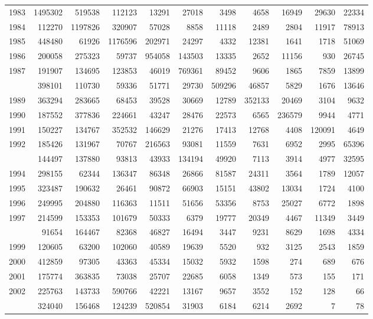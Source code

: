 \documentclass[
]{article}
\begin{document}
\begin{longtable}[t]{lrrrrrrrrrr}
1983 & 1495302 & 519538 & 112123 & 13291 & 27018 & 3498 & 4658 & 16949 & 29630 & 22334\\
1984 & 112270 & 1197826 & 320907 & 57028 & 8858 & 11118 & 2489 & 2804 & 11917 & 78913\\
1985 & 448480 & 61926 & 1176596 & 202971 & 24297 & 4332 & 12381 & 1641 & 1718 & 51069\\
1986 & 200058 & 275323 & 59737 & 954058 & 143503 & 13335 & 2652 & 11156 & 930 & 26745\\
1987 & 191907 & 134695 & 123853 & 46019 & 769361 & 89452 & 9606 & 1865 & 7859 & 13899\\
\addlinespace
1988 & 398101 & 110730 & 59336 & 51771 & 29730 & 509296 & 46857 & 5829 & 1676 & 13646\\
1989 & 363294 & 283665 & 68453 & 39528 & 30669 & 12789 & 352133 & 20469 & 3104 & 9632\\
1990 & 187552 & 377836 & 224661 & 43247 & 28476 & 22573 & 6565 & 236579 & 9944 & 4771\\
1991 & 150227 & 134767 & 352532 & 146629 & 21276 & 17413 & 12768 & 4408 & 120091 & 4649\\
1992 & 185426 & 131967 & 70767 & 216563 & 93081 & 11559 & 7631 & 6952 & 2995 & 65396\\
\addlinespace
1993 & 144497 & 137880 & 93813 & 43933 & 134194 & 49920 & 7113 & 3914 & 4977 & 32595\\
1994 & 298155 & 62344 & 136347 & 86348 & 26866 & 81587 & 24311 & 3564 & 1789 & 12057\\
1995 & 323487 & 190632 & 26461 & 90872 & 66903 & 15151 & 43802 & 13034 & 1724 & 4100\\
1996 & 249995 & 204880 & 116363 & 11511 & 51656 & 53356 & 8753 & 25027 & 6772 & 1898\\
1997 & 214599 & 153353 & 101679 & 50333 & 6379 & 19777 & 20349 & 4467 & 11349 & 3449\\
\addlinespace
1998 & 91654 & 164467 & 82368 & 46827 & 16494 & 3447 & 9231 & 8629 & 1698 & 4334\\
1999 & 120605 & 63200 & 102060 & 40589 & 19639 & 5520 & 932 & 3125 & 2543 & 1859\\
2000 & 412859 & 97305 & 43363 & 45334 & 15032 & 5932 & 1598 & 274 & 689 & 676\\
2001 & 175774 & 363835 & 73038 & 25707 & 22685 & 6058 & 1349 & 573 & 155 & 171\\
2002 & 225763 & 143733 & 590766 & 42221 & 13167 & 9657 & 3552 & 152 & 128 & 66\\
\addlinespace
2003 & 324040 & 156468 & 124239 & 520854 & 31903 & 6184 & 6214 & 2692 & 7 & 78\\

\end{longtable}
\end{document}
